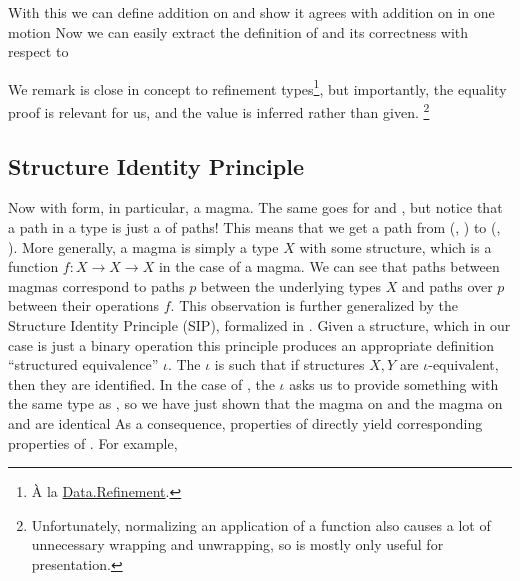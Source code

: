 With this we can define addition on \bL{} and show it agrees with addition on \bN{} in one motion
Now we can easily extract the definition of  and its correctness with respect to \AgdaFunction{\_+\_} 

We remark  is close in concept to refinement types\footnote{À la \href{https://agda.github.io/agda-stdlib/Data.Refinement.html}{Data.Refinement}.}, but importantly, the equality proof is relevant for us, and the value is inferred rather than given. \footnote{Unfortunately, normalizing an application of a  function also causes a lot of unnecessary wrapping and unwrapping, so  is mostly only useful for presentation.} %


\subsection{Structure Identity Principle}
Now \bN{} with  form, in particular, a magma. The same goes for \bL{} and , but notice that a path in a  type is just a  of paths! This means that we get a path from (\bN{}, ) to (\bL{}, ). More generally, a magma is simply a type $X$ with some structure, which is a function $f: X \to X \to X$ in the case of a magma. We can see that paths between magmas correspond to paths $p$ between the underlying types $X$ and paths over $p$ between their operations $f$. This observation is further generalized by the Structure Identity Principle (SIP), formalized in \cite{iri}. Given a structure, which in our case is just a binary operation
this principle produces an appropriate definition ``structured equivalence'' $\iota$. The $\iota$ is such that if structures $X, Y$ are $\iota$-equivalent, then they are identified. In the case of , the $\iota$ asks us to provide something with the same type as , so we have just shown that the  magma on \bL{}
and the \AgdaFunction{\_+\_} magma on \bN{} and are identical
As a consequence, properties of \AgdaFunction{\_+\_} directly yield corresponding properties of . For example,
